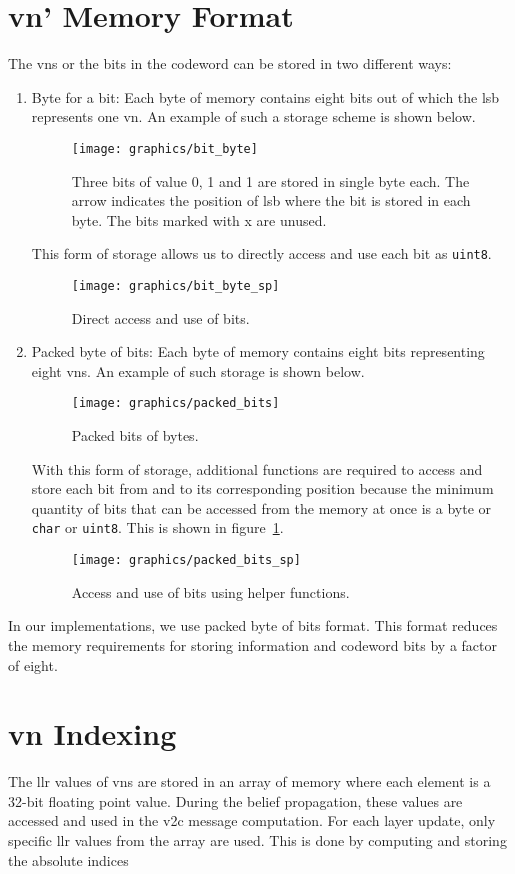 \section{\acrfull{vn}' Memory Format}
The \glspl{vn} or the bits in the codeword can be stored in two different ways:
\begin{enumerate}
  \item Byte for a bit: Each byte of memory contains eight bits out of which the \gls{lsb} represents one \gls{vn}. An example of such a storage scheme is shown below.
  \begin{figure}[htbp]
    \centering
    \texttt{[image: graphics/bit\_byte]}
    \caption{Three bits of value 0, 1 and 1 are stored in single byte each. The arrow indicates the position of \gls{lsb} where the bit is stored in each byte. The bits marked with x are unused.}
  \end{figure}
  This form of storage allows us to directly access and use each bit as \texttt{uint8}.
  \begin{figure}[htbp]
    \centering
    \texttt{[image: graphics/bit\_byte\_sp]}
    \caption{Direct access and use of bits.}
  \end{figure}
  \item Packed byte of bits: Each byte of memory contains eight bits representing eight \glspl{vn}. An example of such storage is shown below.
  \begin{figure}[htbp]
    \centering
    \texttt{[image: graphics/packed\_bits]}
    \caption{Packed bits of bytes.}
  \end{figure}
  With this form of storage, additional functions are required to access and store each bit from and to its corresponding position because the minimum quantity of bits that can be accessed from the memory at once is a byte or \texttt{char} or \texttt{uint8}. This is shown in figure~\ref{fig:packed_spb}.
  \begin{figure}[htbp]
    \centering
    \texttt{[image: graphics/packed\_bits\_sp]}
    \caption{Access and use of bits using helper functions.}
    \label{fig:packed_spb}
  \end{figure}
\end{enumerate}
In our implementations, we use packed byte of bits format. This format reduces the memory requirements for storing information and codeword bits by a factor of eight.

\section{\acrfull{vn} Indexing}
The \gls{llr} values of \glspl{vn} are stored in an array of memory where each element is a 32-bit floating point value. During the belief propagation, these values are accessed and used in the \gls{v2c} message computation. For each layer update, only specific \gls{llr} values from the array are used. This is done by computing and storing the absolute indices 